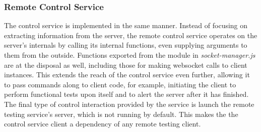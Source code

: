 \documentclass[conference]{IEEEtran}
\begin{document}
\subsubsection{Remote Control Service}
The control service is implemented in the same manner. Instead of focusing on extracting information from the server, the remote control service operates on the server's internals by calling its internal functions, even supplying arguments to them from the outside. Functions exported from the module in \textit{socket-manager.js} are at the disposal as well, including those for making websocket calls to client instances. This extends the reach of the control service even further, allowing it to pass commands along to client code, for example, initiating the client to perform functional tests upon itself and to alert the server after it has finished. The final type of control interaction provided by the service is launch the remote testing service's server, which is not running by default. This makes the the control service client a dependency of any remote testing client.
\end{document}
